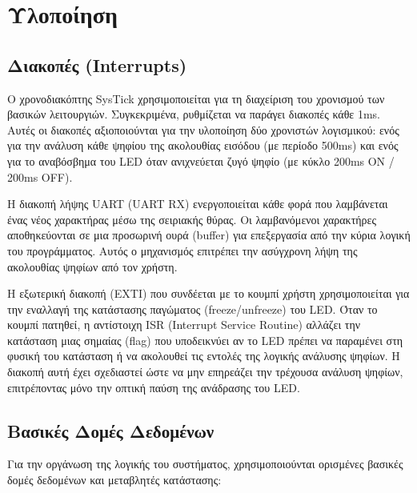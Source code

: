 \documentclass{article}
\begin{document}
\section{Υλοποίηση}

\subsection{Διακοπές (Interrupts)}
Ο χρονοδιακόπτης SysTick χρησιμοποιείται για τη διαχείριση του χρονισμού των βασικών λειτουργιών. Συγκεκριμένα, ρυθμίζεται να παράγει διακοπές κάθε 1ms. Αυτές οι διακοπές αξιοποιούνται για την υλοποίηση δύο χρονιστών λογισμικού: ενός για την ανάλυση κάθε ψηφίου της ακολουθίας εισόδου (με περίοδο 500ms) και ενός για το αναβόσβημα του LED όταν ανιχνεύεται ζυγό ψηφίο (με κύκλο 200ms ON / 200ms OFF).

Η διακοπή λήψης UART (UART RX) ενεργοποιείται κάθε φορά που λαμβάνεται ένας νέος χαρακτήρας μέσω της σειριακής θύρας. Οι λαμβανόμενοι χαρακτήρες αποθηκεύονται σε μια προσωρινή ουρά (buffer) για επεξεργασία από την κύρια λογική του προγράμματος. Αυτός ο μηχανισμός επιτρέπει την ασύγχρονη λήψη της ακολουθίας ψηφίων από τον χρήστη.

Η εξωτερική διακοπή (EXTI) που συνδέεται με το κουμπί χρήστη χρησιμοποιείται για την εναλλαγή της κατάστασης παγώματος (freeze/unfreeze) του LED. Όταν το κουμπί πατηθεί, η αντίστοιχη ISR (Interrupt Service Routine) αλλάζει την κατάσταση μιας σημαίας (flag) που υποδεικνύει αν το LED πρέπει να παραμένει στη φυσική του κατάσταση ή να ακολουθεί τις εντολές της λογικής ανάλυσης ψηφίων. Η διακοπή αυτή έχει σχεδιαστεί ώστε να μην επηρεάζει την τρέχουσα ανάλυση ψηφίων, επιτρέποντας μόνο την οπτική παύση της ανάδρασης του LED.

\subsection{Βασικές Δομές Δεδομένων}
Για την οργάνωση της λογικής του συστήματος, χρησιμοποιούνται ορισμένες βασικές δομές δεδομένων και μεταβλητές κατάστασης:
\end{document}
